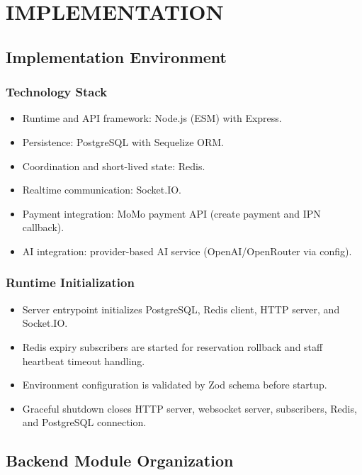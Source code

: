 \chapter{IMPLEMENTATION}
\label{ch:implementation}

\section{Implementation Environment}

\subsection{Technology Stack}

\begin{itemize}
    \item Runtime and API framework: Node.js (ESM) with Express.
    \item Persistence: PostgreSQL with Sequelize ORM.
    \item Coordination and short-lived state: Redis.
    \item Realtime communication: Socket.IO.
    \item Payment integration: MoMo payment API (create payment and IPN callback).
    \item AI integration: provider-based AI service (OpenAI/OpenRouter via config).
\end{itemize}

\subsection{Runtime Initialization}

\begin{itemize}
    \item Server entrypoint initializes PostgreSQL, Redis client, HTTP server, and Socket.IO.
    \item Redis expiry subscribers are started for reservation rollback and staff heartbeat timeout handling.
    \item Environment configuration is validated by Zod schema before startup.
    \item Graceful shutdown closes HTTP server, websocket server, subscribers, Redis, and PostgreSQL connection.
\end{itemize}

\section{Backend Module Organization}

